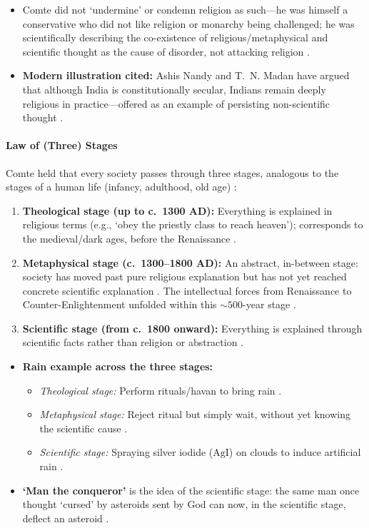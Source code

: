 \begin{CriticalPoint}
\begin{itemize}
    \item Comte did not `undermine' or condemn religion as such---he was himself a conservative who did not like religion or monarchy being challenged; he was scientifically describing the co-existence of religious/metaphysical and scientific thought as the cause of disorder, not attacking religion .
    \item \textbf{Modern illustration cited:} Ashis Nandy and T.~N. Madan have argued that although India is constitutionally secular, Indians remain deeply religious in practice---offered as an example of persisting non-scientific thought .
\end{itemize}
\end{CriticalPoint}

\paragraph{Law of (Three) Stages}
Comte held that every society passes through three stages, analogous to the stages of a human life (infancy, adulthood, old age) :
\begin{enumerate}
    \item \textbf{Theological stage (up to c.~1300 AD):} Everything is explained in religious terms (e.g., `obey the priestly class to reach heaven'); corresponds to the medieval/dark ages, before the Renaissance .
    \item \textbf{Metaphysical stage (c.~1300--1800 AD):} An abstract, in-between stage: society has moved past pure religious explanation but has not yet reached concrete scientific explanation . The intellectual forces from Renaissance to Counter-Enlightenment unfolded within this $\sim 500$-year stage .
    \item \textbf{Scientific stage (from c.~1800 onward):} Everything is explained through scientific facts rather than religion or abstraction .
\end{enumerate}

\begin{ExampleBox}
\begin{itemize}
    \item \textbf{Rain example across the three stages:}
    \begin{itemize}
        \item \textit{Theological stage:} Perform rituals/havan to bring rain .
        \item \textit{Metaphysical stage:} Reject ritual but simply wait, without yet knowing the scientific cause .
        \item \textit{Scientific stage:} Spraying silver iodide ($\text{AgI}$) on clouds to induce artificial rain .
    \end{itemize}
    \item \textbf{`Man the conqueror'} is the idea of the scientific stage: the same man once thought `cursed' by asteroids sent by God can now, in the scientific stage, deflect an asteroid .
\end{itemize}
\end{ExampleBox}

